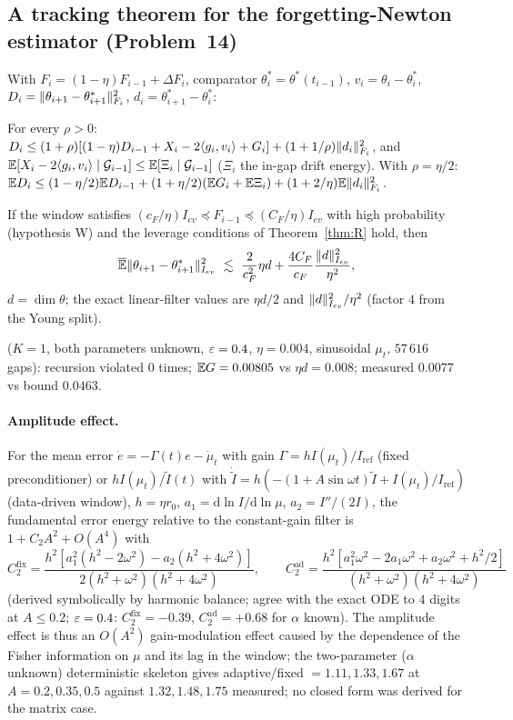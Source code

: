 \subsection{A tracking theorem for the forgetting-Newton estimator (Problem~14)}
With $F_i=(1-\eta)F_{i-1}+\Delta F_i$, comparator $\theta^*_i=\theta^*(t_{i-1})$, $v_i=\theta_i-\theta^*_i$, $D_i=\lVert \theta_{i+1}-\theta^*_{i+1}\rVert_{F_i}^2$, $d_i=\theta^*_{i+1}-\theta^*_i$:
\begin{proposition}[recursion]\label{prop:trackrec}\Pt{}
For every $\rho>0$: $D_i\le(1+\rho)[(1-\eta)D_{i-1}+X_i-2\langle g_i,v_i\rangle+G_i]+(1+1/\rho)\lVert d_i\rVert_{F_i}^2$, and $\mathbb{E}[X_i-2\langle g_i,v_i\rangle\mid\mathcal G_{i-1}]\le\mathbb{E}[\Xi_i\mid\mathcal G_{i-1}]$ ($\Xi_i$ the in-gap drift energy). With $\rho=\eta/2$: $\mathbb{E} D_i\le(1-\eta/2)\mathbb{E} D_{i-1}+(1+\eta/2)(\mathbb{E} G_i+\mathbb{E}\Xi_i)+(1+2/\eta)\mathbb{E}\lVert d_i\rVert_{F_i}^2$.
\end{proposition}
\begin{theorem}\label{thm:track}\Ps{}
If the window satisfies $(c_F/\eta)I_{ev}\preceq F_{i-1}\preceq(C_F/\eta)I_{ev}$ with high probability (hypothesis W) and the leverage conditions of Theorem~\ref{thm:R} hold, then
\[
\overline{\E}\norm{\theta_{i+1}-\theta^*_{i+1}}_{I_{ev}}^2\ \lesssim\ \frac{2}{c_F^2}\eta d+\frac{4C_F}{c_F}\frac{\norm{d}^2_{I_{ev}}}{\eta^2},
\]
$d=\dim\theta$; the exact linear-filter values are $\eta d/2$ and $\lVert d\rVert^2_{I_{ev}}/\eta^2$ (factor $4$ from the Young split).
\end{theorem}
\Nt{} ($K=1$, both parameters unknown, $\varepsilon=0.4$, $\eta=0.004$, sinusoidal $\mu_t$, $57\,616$ gaps): recursion violated $0$ times; $\mathbb{E} G=0.00805$ vs $\eta d=0.008$; measured $0.0077$ vs bound $0.0463$.

\paragraph{Amplitude effect.} For the mean error $\dot e=-\Gamma(t)e-\dot\mu_t$ with gain $\Gamma=hI(\mu_t)/I_{\mathrm{ref}}$ (fixed preconditioner) or $hI(\mu_t)/\tilde I(t)$ with $\dot{\tilde I}=h(-(1+A\sin\omega t)\tilde I+I(\mu_t)/I_{\mathrm{ref}})$ (data-driven window), $h=\eta r_0$, $a_1=\mathrm d\ln I/\mathrm d\ln\mu$, $a_2=I''/(2I)$, the fundamental error energy relative to the constant-gain filter is $1+C_2A^2+O(A^4)$ with
\[
C_2^{\mathrm{fix}}=\frac{h^2[a_1^2(h^2-2\omega^2)-a_2(h^2+4\omega^2)]}{2(h^2+\omega^2)(h^2+4\omega^2)},\qquad
C_2^{\mathrm{ad}}=\frac{h^2[a_1^2\omega^2-2a_1\omega^2+a_2\omega^2+h^2/2]}{(h^2+\omega^2)(h^2+4\omega^2)}
\]
(derived symbolically by harmonic balance; agree with the exact ODE to $4$ digits at $A\le0.2$; $\varepsilon=0.4$: $C_2^{\mathrm{fix}}=-0.39$, $C_2^{\mathrm{ad}}=+0.68$ for $\alpha$ known). The amplitude effect is thus an $O(A^2)$ gain-modulation effect caused by the dependence of the Fisher information on $\mu$ and its lag in the window; the two-parameter ($\alpha$ unknown) deterministic skeleton gives adaptive/fixed $=1.11,1.33,1.67$ at $A=0.2,0.35,0.5$ against $1.32,1.48,1.75$ measured; no closed form was derived for the matrix case.

